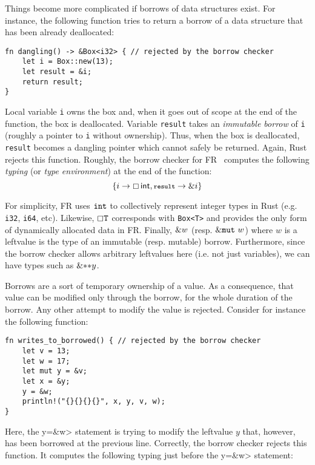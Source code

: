 Things become more complicated if borrows of data structures exist.
For instance, the following function tries to return a borrow of
a data structure that has been already deallocated:

\begin{lstlisting}
fn dangling() -> &Box<i32> { // rejected by the borrow checker
    let i = Box::new(13);
    let result = &i;
    return result;
}
\end{lstlisting}

\noindent

Local variable \lstinline{i} owns the box and, when it goes out of
scope at the end of the function, the box is deallocated.  Variable
\lstinline{result} takes an {\em immutable borrow} of \lstinline{i}
(roughly a pointer to \lstinline{i} without ownership).  Thus, when
the box is deallocated, \lstinline{result} becomes a dangling pointer
which cannot safely be returned.  Again, Rust rejects this function.
Roughly, the borrow checker for FR~\cite{Pearce21} computes the
following \emph{typing} (or \emph{type environment}) at the end of the
function:
\[
\{i\to\boxtype{\mathsf{int},\<result>\to\borrow i}\}
\]

For simplicity, FR uses ${\tt int}$ to collectively represent integer
types in Rust (e.g. \lstinline{i32}, \lstinline{i64}, etc).  Likewise,
$\boxempty{\tt T}$ corresponds with \lstinline{Box<T>} and provides
the only form of dynamically allocated data in FR.  Finally, $\&
w$ (resp. $\&\mathtt{mut}\  w$) where $w$ is a leftvalue is the type of an
immutable (resp. mutable) borrow.  Furthermore, since the borrow
checker allows arbitrary leftvalues here (i.e. not just variables), we
can have types such as $\&\mathtt{**}y$.

Borrows are a sort of temporary ownership of a value. As a consequence,
that value can be modified only through the borrow, for the whole
duration of the borrow. Any other attempt to modify the value is rejected.
Consider for instance the following function:

\begin{lstlisting}
fn writes_to_borrowed() { // rejected by the borrow checker
    let v = 13;
    let w = 17;
    let mut y = &v;
    let x = &y;
    y = &w;
    println!("{}{}{}{}", x, y, v, w);
}
\end{lstlisting}

\noindent
Here, the \<y=\&w> statement is trying to modify the leftvalue $y$
that, however, has been borrowed at the previous line. Correctly, the borrow
checker rejects this function. It computes the following typing
just before the \<y=\&w> statement:

